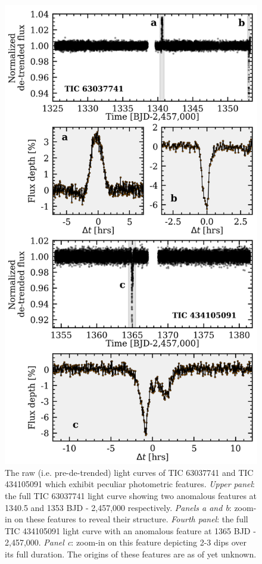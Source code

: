 \begin{figure}
  \centering
  \includegraphics[width=0.6\hsize]{figures/wtfLCs.png}
  \caption[The exotic light curves of TICs 63037741 and 434105091.]
          {The raw (i.e. pre-de-trended)
    light curves of TIC 63037741 and TIC 434105091 which exhibit peculiar
    photometric features. \emph{Upper panel}: the full TIC 63037741 light curve
    showing two anomalous features at 1340.5 and 1353 BJD - 2,457,000 respectively. \emph{Panels a and b}:
    zoom-in on these features to reveal their structure. \emph{Fourth panel}: the full TIC 434105091
    light curve with an anomalous feature at 1365 BJD - 2,457,000. \emph{Panel c}: zoom-in on this
    feature depicting 2-3 dips over its full duration. The origins of these features are as of
    yet unknown.}
  \label{fig:wtf}
\end{figure}
\fi


